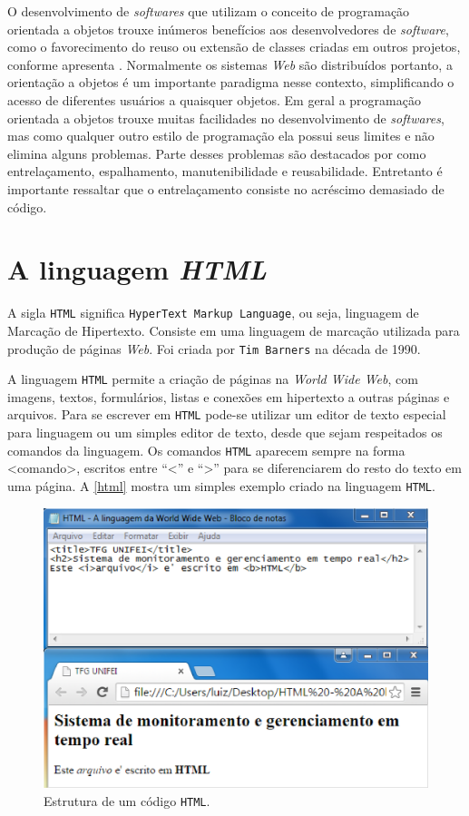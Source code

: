 O desenvolvimento de \textit{softwares} que utilizam o conceito de programação orientada a objetos trouxe inúmeros benefícios 
aos desenvolvedores de \textit{software}, como o favorecimento do reuso ou extensão de classes criadas em outros projetos, 
conforme apresenta \cite[p.~1]{soares8}. Normalmente os sistemas \textit{Web} são distribuídos portanto, a orientação a objetos é um
importante paradigma nesse contexto, simplificando o acesso de diferentes usuários a quaisquer objetos.  
Em geral a programação orientada a objetos trouxe muitas facilidades no desenvolvimento de \textit{softwares}, mas como 
qualquer outro estilo de programação ela possui seus limites e não elimina alguns problemas. Parte desses problemas 
são destacados por \cite[p.~16]{antonio2005} como entrelaçamento, espalhamento, manutenibilidade e reusabilidade. Entretanto
é importante ressaltar que o entrelaçamento consiste no acréscimo demasiado de código.

\section{A linguagem \textit{HTML}}

A sigla \texttt{HTML} significa \texttt{HyperText Markup Language}, ou seja, linguagem de Marcação de Hipertexto. Consiste em uma linguagem 
de marcação utilizada para produção de páginas \textit{Web}. Foi criada por \texttt{Tim Barners} na década de 1990.

A linguagem \texttt{HTML} permite a criação de páginas na \textit{World Wide Web}, com imagens, textos, formulários, listas e conexões
em hipertexto a outras páginas e arquivos. Para se escrever em \texttt{HTML} pode-se utilizar um editor de texto especial para
linguagem ou um simples editor de texto, desde que sejam respeitados os comandos da linguagem. 
Os comandos \texttt{HTML} aparecem sempre na forma <comando>, escritos entre “<” e “>” para se diferenciarem do resto do texto 
em uma página. A \autoref{html} mostra um simples exemplo criado na linguagem \texttt{HTML}.

\begin{figure}[h]
	\centering
	\caption{\label{html}Estrutura de um código \texttt{HTML}.}
		\includegraphics[keepaspectratio=true,scale=0.7]{figuras/html.eps}
\end{figure}

